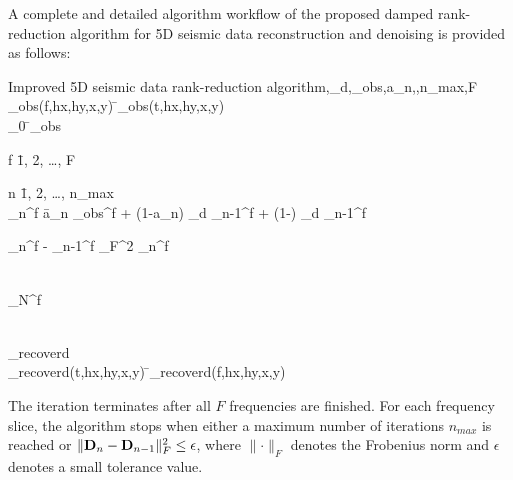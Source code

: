 A complete and detailed algorithm workflow of the proposed damped rank-reduction algorithm for 5D seismic data reconstruction and denoising is provided as follows: %
\begin{algorithm}{Improved 5D seismic data rank-reduction algorithm}{,_d,_{obs},a_n,\epsilon,n_{max},F}
  _{obs}(f,hx,hy,x,y) \= _{obs}(t,hx,hy,x,y)  \\
  _0 \= _{obs} \\
  \begin{FOR}{f \= 1, 2, \ldots, F} \\	
      \begin{FOR}{n \= 1, 2, \ldots, n_{max}} \\
          _n^f \= a_n _{obs}^f + (1-a_n)  _d _{n-1}^f + (1-) _d _{n-1}^f\\
      \begin{IF}{\Arrowvert {}_n^f - _{n-1}^f \Arrowvert_F^2 \leq \epsilon} 
      \RETURN {}_n^f
      \end{IF}     
      \end{FOR} \\
      \RETURN {}_N^f
   \end{FOR}\\ 
  \RETURN {}_{recoverd}\\
  _{recoverd}(t,hx,hy,x,y) \= _{recoverd}(f,hx,hy,x,y) 
\end{algorithm}
The iteration terminates after all $F$ frequencies are finished. For each frequency slice, the algorithm stops when either a maximum number of iterations $n_{max}$ is reached or $\Arrowvert \mathbf{D}_n - \mathbf{D}_{n-1}\Arrowvert_F^2 \leq \epsilon$, where $\parallel \cdot \parallel_F$ denotes the Frobenius norm and $\epsilon$ denotes a small tolerance value.%

